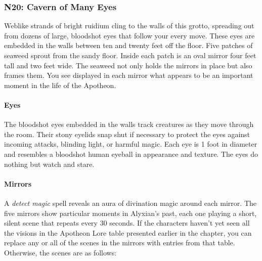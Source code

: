 \documentclass[letterpaper, 11pt, bg=full, twocolumn]{dndbook}
\begin{document}
\subsubsection{N20: Cavern of Many Eyes}

\begin{DndReadAloud}
Weblike strands of bright ruidium cling to the walls of this grotto, spreading out from dozens of large, bloodshot eyes that follow your every move. These eyes are embedded in the walls between ten and twenty feet off the floor.
Five patches of seaweed sprout from the sandy floor. Inside each patch is an oval mirror four feet tall and two feet wide. The seaweed not only holds the mirrors in place but also frames them. You see displayed in each mirror what appears to be an important moment in the life of the Apotheon.
\end{DndReadAloud}

\paragraph{Eyes}

The bloodshot eyes embedded in the walls track creatures as they move through the room. Their stony eyelids snap shut if necessary to protect the eyes against incoming attacks, blinding light, or harmful magic. Each eye is 1 foot in diameter and resembles a bloodshot human eyeball in appearance and texture. The eyes do nothing but watch and stare.

\paragraph{Mirrors}

A \textit{detect magic} spell reveals an aura of divination magic around each mirror. The five mirrors show particular moments in Alyxian's past, each one playing a short, silent scene that repeats every 30 seconds. If the characters haven't yet seen all the visions in the Apotheon Lore table presented earlier in the chapter, you can replace any or all of the scenes in the mirrors with entries from that table. Otherwise, the scenes are as follows:
\end{document}
